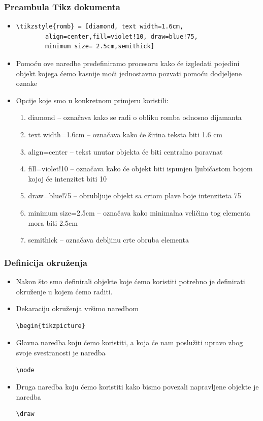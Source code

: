 \documentclass{beamer}
\begin{document}
\begin{frame}[fragile]
	\frametitle{Preambula Tikz dokumenta}
		\begin{itemize}
		\item \begin{verbatim}\tikzstyle{romb} = [diamond, text width=1.6cm,
		align=center,fill=violet!10, draw=blue!75,
		minimum size= 2.5cm,semithick]\end{verbatim}
		\item Pomoću ove naredbe predefiniramo procesoru kako će izgledati pojedini objekt kojega ćemo kasnije moći jednostavno pozvati pomoću dodjeljene oznake
		\item Opcije koje smo u konkretnom primjeru koristili:
			\begin{enumerate}
				\item diamond – označava kako se radi o obliku romba odnosno dijamanta
				\item text width=1.6cm – označava kako će širina teksta biti 1.6 cm
				\item align=center – tekst unutar objekta će biti centralno poravnat
				\item fill=violet!10 – označava kako će objekt biti ispunjen ljubičastom bojom kojoj će intenzitet biti 10%
				\item draw=blue!75 – obrubljuje objekt sa crtom plave boje intenziteta 75%
				\item minimum size=2.5cm – označava kako minimalna veličina tog elementa mora biti 2.5cm
				\item semithick – označava debljinu crte obruba elementa
			\end{enumerate}
  		\end{itemize}	
\end{frame}

\begin{frame}[fragile]
	\frametitle{Definicija okruženja}
		\begin{itemize}
		\item Nakon što smo definirali objekte koje ćemo koristiti potrebno je definirati okruženje u kojem ćemo raditi.
		\item Dekaraciju okruženja vršimo naredbom \begin{verbatim}\begin{tikzpicture}\end{verbatim}
		\item Glavna naredba koju ćemo koristiti, a koja će nam poslužiti upravo zbog svoje svestranosti je naredba \begin{verbatim}\node\end{verbatim} 
		\item Druga naredba koju ćemo koristiti kako bismo povezali napravljene objekte je naredba \begin{verbatim}\draw\end{verbatim}
  		\end{itemize}	
\end{frame}
\end{document}
